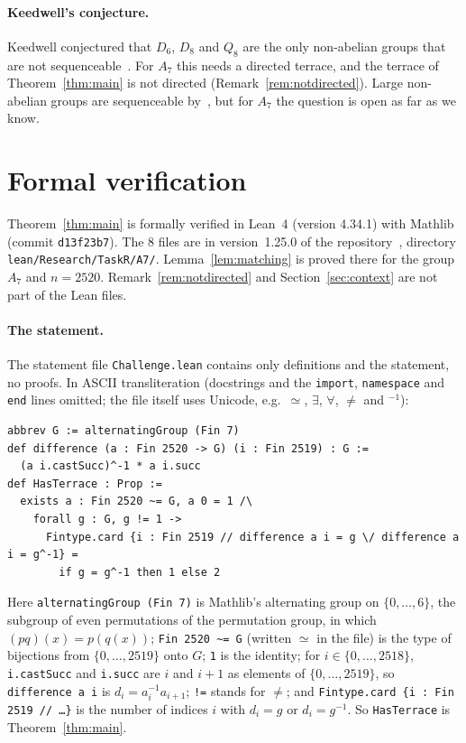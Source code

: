 \documentclass[11pt]{article}
\theoremstyle{definition}
\theoremstyle{remark}
\newcommand{\repoversion}{1.25.0}
\newcommand{\Alt}{A_7}
\begin{document}
\paragraph{Keedwell's conjecture.}
Keedwell conjectured that $D_6$, $D_8$ and $Q_8$ are the only non-abelian
groups that are not sequenceable~\cite[Conjecture~15]{survey}. For $\Alt$ this
needs a directed terrace, and the terrace of Theorem~\ref{thm:main} is not
directed (Remark~\ref{rem:notdirected}). Large non-abelian groups are
sequenceable by~\cite[Theorem~6.12]{mp}, but for $\Alt$ the question is open
as far as we know.

{\sloppy
\section{Formal verification}\label{sec:lean}

Theorem~\ref{thm:main} is formally verified in Lean~4 (version 4.34.1) with
Mathlib~\cite{mathlib} (commit \texttt{d13f23b7}). The $8$ files are in
version~\repoversion{} of the repository~\cite{repo}, directory
\texttt{lean/Research/TaskR/A7/}. Lemma~\ref{lem:matching} is proved there for
the group $\Alt$ and $n=2520$. Remark~\ref{rem:notdirected} and
Section~\ref{sec:context} are not part of the Lean files.

\paragraph{The statement.}
The statement file \texttt{Challenge.lean} contains only definitions and the
statement, no proofs. In ASCII transliteration (docstrings and the
\texttt{import}, \texttt{namespace} and \texttt{end} lines omitted; the file
itself uses Unicode, e.g.\ $\simeq$, $\exists$, $\forall$, $\ne$ and
${}^{-1}$):
{\footnotesize
\begin{verbatim}
abbrev G := alternatingGroup (Fin 7)
def difference (a : Fin 2520 -> G) (i : Fin 2519) : G :=
  (a i.castSucc)^-1 * a i.succ
def HasTerrace : Prop :=
  exists a : Fin 2520 ~= G, a 0 = 1 /\
    forall g : G, g != 1 ->
      Fintype.card {i : Fin 2519 // difference a i = g \/ difference a i = g^-1} =
        if g = g^-1 then 1 else 2
\end{verbatim}}
\noindent Here \texttt{alternatingGroup (Fin 7)} is Mathlib's alternating
group on $\{0,\dots,6\}$, the subgroup of even permutations of the
permutation group, in which $(pq)(x)=p(q(x))$; \texttt{Fin 2520 \textasciitilde= G}
(written $\simeq$ in the file) is the type of bijections from
$\{0,\dots,2519\}$ onto $G$; \texttt{1} is the identity; for
$i\in\{0,\dots,2518\}$, \texttt{i.castSucc} and \texttt{i.succ} are $i$ and
$i+1$ as elements of $\{0,\dots,2519\}$, so \texttt{difference a i} is
$d_i=a_i^{-1}a_{i+1}$; \texttt{!=} stands for $\ne$; and
\texttt{Fintype.card \{i : Fin 2519 // \dots\}} is the number of indices $i$
with $d_i=g$ or $d_i=g^{-1}$. So \texttt{HasTerrace} is
Theorem~\ref{thm:main}.

}
\end{document}
